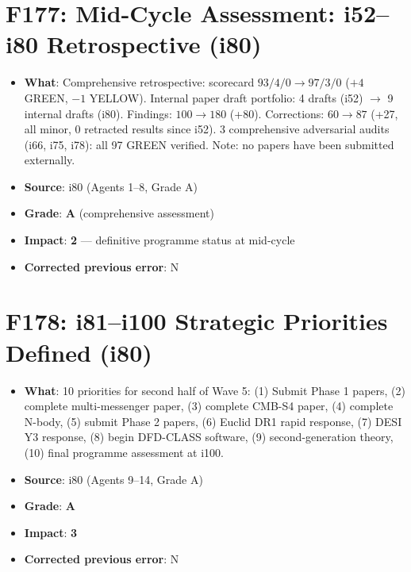\documentclass[11pt,a4paper]{article}
\newcommand{\grade}[1]{\textbf{#1}}
\newcommand{\impact}[1]{\textbf{#1}}
\begin{document}
\section{F177: Mid-Cycle Assessment: i52--i80 Retrospective (i80)}
\begin{itemize}[nosep]
\item \textbf{What}: Comprehensive retrospective: scorecard $93/4/0 \to 97/3/0$ ($+4$ GREEN, $-1$ YELLOW). Internal paper draft portfolio: 4 drafts (i52) $\to$ 9 internal drafts (i80). Findings: $100 \to 180$ (+80). Corrections: $60 \to 87$ (+27, all minor, 0 retracted results since i52). 3 comprehensive adversarial audits (i66, i75, i78): all 97 GREEN verified. Note: no papers have been submitted externally.
\item \textbf{Source}: i80 (Agents 1--8, Grade A)
\item \textbf{Grade}: \grade{A} (comprehensive assessment)
\item \textbf{Impact}: \impact{2} --- definitive programme status at mid-cycle
\item \textbf{Corrected previous error}: N
\end{itemize}

\section{F178: i81--i100 Strategic Priorities Defined (i80)}
\begin{itemize}[nosep]
\item \textbf{What}: 10 priorities for second half of Wave 5: (1) Submit Phase 1 papers, (2) complete multi-messenger paper, (3) complete CMB-S4 paper, (4) complete N-body, (5) submit Phase 2 papers, (6) Euclid DR1 rapid response, (7) DESI Y3 response, (8) begin DFD-CLASS software, (9) second-generation theory, (10) final programme assessment at i100.
\item \textbf{Source}: i80 (Agents 9--14, Grade A)
\item \textbf{Grade}: \grade{A}
\item \textbf{Impact}: \impact{3}
\item \textbf{Corrected previous error}: N
\end{itemize}

\end{document}
